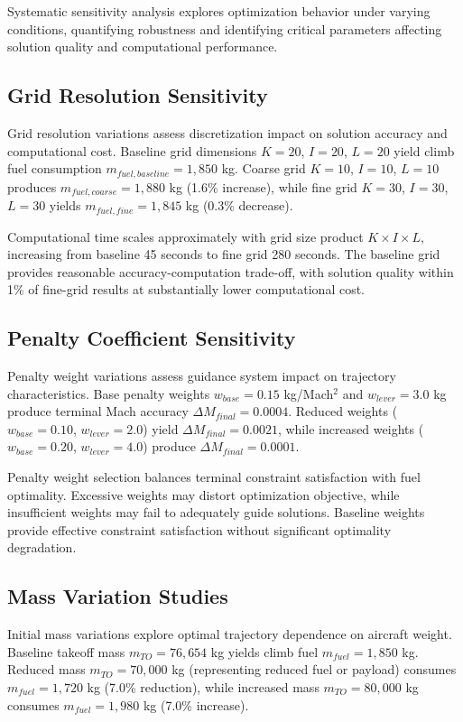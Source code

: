 Systematic sensitivity analysis explores optimization behavior under varying conditions, quantifying robustness and identifying critical parameters affecting solution quality and computational performance.

\subsection{Grid Resolution Sensitivity}

Grid resolution variations assess discretization impact on solution accuracy and computational cost. Baseline grid dimensions $K = 20$, $I = 20$, $L = 20$ yield climb fuel consumption $m_{fuel,baseline} = 1,850$ kg. Coarse grid $K = 10$, $I = 10$, $L = 10$ produces $m_{fuel,coarse} = 1,880$ kg (1.6\% increase), while fine grid $K = 30$, $I = 30$, $L = 30$ yields $m_{fuel,fine} = 1,845$ kg (0.3\% decrease).

Computational time scales approximately with grid size product $K \times I \times L$, increasing from baseline 45 seconds to fine grid 280 seconds. The baseline grid provides reasonable accuracy-computation trade-off, with solution quality within 1\% of fine-grid results at substantially lower computational cost.

\subsection{Penalty Coefficient Sensitivity}

Penalty weight variations assess guidance system impact on trajectory characteristics. Base penalty weights $w_{base} = 0.15$ kg/Mach$^2$ and $w_{lever} = 3.0$ kg produce terminal Mach accuracy $\Delta M_{final} = 0.0004$. Reduced weights ($w_{base} = 0.10$, $w_{lever} = 2.0$) yield $\Delta M_{final} = 0.0021$, while increased weights ($w_{base} = 0.20$, $w_{lever} = 4.0$) produce $\Delta M_{final} = 0.0001$.

Penalty weight selection balances terminal constraint satisfaction with fuel optimality. Excessive weights may distort optimization objective, while insufficient weights may fail to adequately guide solutions. Baseline weights provide effective constraint satisfaction without significant optimality degradation.

\subsection{Mass Variation Studies}

Initial mass variations explore optimal trajectory dependence on aircraft weight. Baseline takeoff mass $m_{TO} = 76,654$ kg yields climb fuel $m_{fuel} = 1,850$ kg. Reduced mass $m_{TO} = 70,000$ kg (representing reduced fuel or payload) consumes $m_{fuel} = 1,720$ kg (7.0\% reduction), while increased mass $m_{TO} = 80,000$ kg consumes $m_{fuel} = 1,980$ kg (7.0\% increase).

